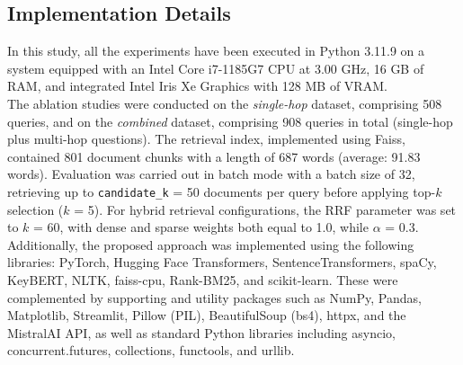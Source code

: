 \documentclass[a4paper,12pt, openany]{book}  %
\begin{document}
\clearpage
\begin{appendices}
    \chapter{Implementation Details}
    \label{appendix:A}

In this study, all the experiments have been executed in Python 3.11.9 on a system equipped with an Intel Core i7-1185G7 CPU at 3.00 GHz, 16 GB of RAM, and integrated Intel Iris Xe Graphics with 128 MB of VRAM.\\ 


\noindent The ablation studies were conducted on the \textit{single-hop} dataset, comprising 508 queries, and on the \textit{combined} dataset, comprising 908 queries in total (single-hop plus multi-hop questions). The retrieval index, implemented using Faiss, contained 801 document chunks with a length of 687 words (average: 91.83 words). Evaluation was carried out in batch mode with a batch size of 32, retrieving up to \texttt{candidate\_k} = 50 documents per query before applying top-$k$ selection ($k$ = 5). For hybrid retrieval configurations, the RRF parameter was set to $k$ = 60, with dense and sparse weights both equal to 1.0, while $\alpha$ = 0.3.\\

\noindent Additionally, the proposed approach was implemented using the following libraries: PyTorch, Hugging Face Transformers, SentenceTransformers, spaCy, KeyBERT, NLTK, faiss-cpu, Rank-BM25, and scikit-learn. These were complemented by supporting and utility packages such as NumPy, Pandas, Matplotlib, Streamlit, Pillow (PIL), BeautifulSoup (bs4), httpx, and the MistralAI API, as well as standard Python libraries including asyncio, concurrent.futures, collections, functools, and urllib.




\end{appendices}

\sloppy
\backmatter
\pagestyle{fancy}

{}
\printbibliography
\end{document}
